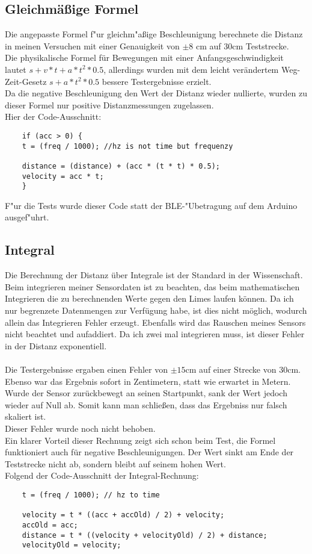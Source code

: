 \subsection{Gleichmäßige Formel}
Die angepasste Formel f"ur gleichm"aßige Beschleunigung berechnete
die Distanz in meinen Versuchen mit einer Genauigkeit von
$\pm8$ cm auf 30cm Teststrecke.\\
Die physikalische Formel für Bewegungen mit einer Anfangsgeschwindigkeit lautet 
$s + v * t  + a * t^2 * 0.5$,
allerdings wurden mit dem leicht verändertem Weg-Zeit-Gesetz $s + a * t^2 * 0.5$ 
bessere Testergebnisse erzielt.\\
Da die negative Beschleunigung den Wert der Distanz wieder nullierte,
wurden zu dieser Formel nur positive Distanzmessungen zugelassen.\\
Hier der Code-Ausschnitt:
\begin{verbatim}
    if (acc > 0) {
    t = (freq / 1000); //hz is not time but frequenzy

    distance = (distance) + (acc * (t * t) * 0.5);
    velocity = acc * t;
    }
\end{verbatim}
F"ur die Tests wurde dieser Code statt der BLE-"Ubetragung auf dem Arduino ausgef"uhrt. 

\subsection{Integral}
Die Berechnung der Distanz über Integrale ist der Standard 
in der Wissenschaft. Beim integrieren meiner Sensordaten ist zu beachten, 
das beim mathematischen Integrieren die zu berechnenden Werte gegen den Limes 
laufen können. Da ich nur begrenzete Datenmengen zur Verfügung habe, ist dies 
nicht möglich, wodurch allein das Integrieren Fehler erzeugt. Ebenfalls wird das 
Rauschen meines Sensors nicht beachtet und aufaddiert. Da ich zwei mal integrieren 
muss, ist dieser Fehler in der Distanz exponentiell.\\
\\
Die Testergebnisse ergaben einen Fehler von $\pm15$cm auf einer Strecke
von 30cm. Ebenso war das Ergebnis sofort in Zentimetern, statt wie erwartet in Metern. 
Wurde der Sensor zurückbewegt an seinen Startpunkt, sank
der Wert jedoch wieder auf Null ab. Somit kann man schließen,
dass das Ergebniss nur falsch skaliert ist.\\
Dieser Fehler wurde noch nicht behoben. \\
Ein klarer Vorteil dieser Rechnung zeigt sich schon beim Test,
die Formel funktioniert auch für negative Beschleunigungen.
Der Wert sinkt am Ende der Teststrecke nicht ab, sondern bleibt
auf seinem hohen Wert.\\
Folgend der Code-Ausschnitt der Integral-Rechnung:
\begin{verbatim}
    t = (freq / 1000); // hz to time

    velocity = t * ((acc + accOld) / 2) + velocity;
    accOld = acc;
    distance = t * ((velocity + velocityOld) / 2) + distance;
    velocityOld = velocity;  
\end{verbatim}